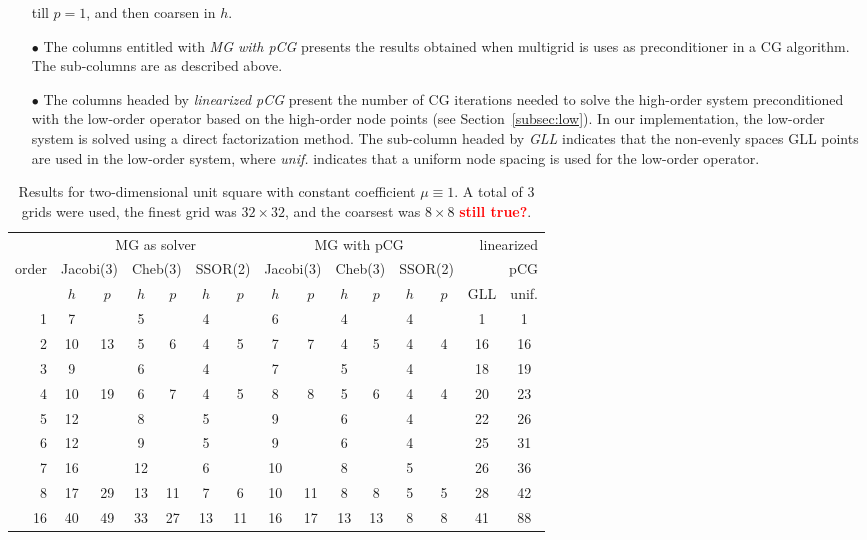 \documentclass[smallcondensed,final]{svjour3}     %
\newcommand{\todo}[1]{\textcolor{red}{\bf #1}}
\begin{document}
\begin{itemize}
  till $p=1$, and then coarsen in $h$.
\item[$\bullet$] The columns entitled with \emph{MG with pCG} presents
  the results obtained when multigrid is uses as preconditioner in a
  CG algorithm. The sub-columns are as described above.
\item[$\bullet$] The columns headed by \emph{linearized pCG} present
  the number of CG iterations needed to solve the high-order system
  preconditioned with the low-order operator based on the high-order
  node points (see Section~\ref{subsec:low}). In our implementation,
  the low-order system is solved using a direct factorization method.
  The sub-column headed by \emph{GLL} indicates that the non-evenly
  spaces GLL points are used in the low-order system, where
  \emph{unif.} indicates that a uniform node spacing is used for the
  low-order operator.
\end{itemize}




\begin{table}
  \caption{\label{tab:box} Results for two-dimensional unit square
    with constant coefficient $\mu\equiv 1$.  A total of 3 grids were
    used, the finest grid was $32\times 32$, and the coarsest was
    $8\times 8$ \todo{still true?}.}
  \centering
  \begin{tabular}{|r|c c|c c|c c||c c|c c|c c||c c|} 
    \hline
    & \multicolumn{6}{c||}{MG as solver} & \multicolumn{6}{c||}{MG with pCG} & \multicolumn{2}{r|}{linearized} \\
    \cline{2-13}
    \!\!\! order \!\!\!\! &  \multicolumn{2}{c|}{\!\scriptsize  Jacobi(3)\!} &  \multicolumn{2}{c|}{\!\scriptsize Cheb(3)\!} & \multicolumn{2}{c||}{\!\scriptsize  SSOR(2)\!} & \multicolumn{2}{c|}{\!\scriptsize Jacobi(3)\!} &  \multicolumn{2}{c|}{\!\scriptsize Cheb(3)\!} & \multicolumn{2}{c||}{\!\scriptsize SSOR(2)\!} & \multicolumn{2}{r|}{pCG}\\
\hline
 & $h$ & $p$ & $h$ & $p$& $h$ & $p$& $h$ & $p$& $h$ & $p$& $h$ & $p$& GLL & unif.\\
 \cline{2-15}
1 & 7 & & 5 & & 4 & & 6 & & 4 & & 4 & & 1 & 1  \\
2 & 10 & 13 & 5 & 6 & 4 & 5 & 7 & 7 & 4 & 5 & 4 & 4 & 16 & 16 \\
3 & 9 & & 6 & & 4 & & 7 & & 5 & & 4 & & 18 & 19  \\
4 & 10 & 19 & 6 & 7 & 4 & 5 & 8 & 8 & 5 & 6 & 4 & 4 & 20 & 23 \\
5 & 12 & & 8 & & 5 & & 9 & & 6 & & 4 & & 22 & 26  \\
6 & 12 & & 9 & & 5 & & 9 & & 6 & & 4 & & 25 & 31  \\
7 & 16 & & 12 & & 6 & & 10 & & 8 & & 5 & & 26 & 36  \\
8 & 17 & 29 & 13 & 11 & 7 & 6 & 10 & 11 & 8 & 8 & 5 & 5 & 28 & 42 \\
16 & 40 & 49 & 33 & 27 & 13 & 11 & 16 & 17 & 13 & 13 & 8 & 8 & 41 & 88\\
\hline
  \end{tabular}
\end{table}
\end{document}
